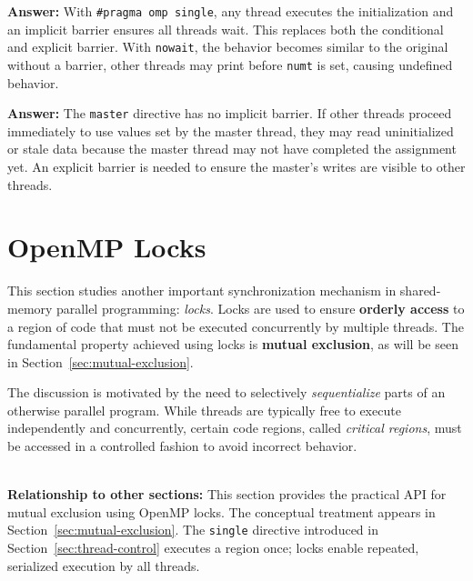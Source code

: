 \begin{ppexercises}
  
  \textbf{Answer:} With \texttt{\#pragma omp single}, any thread executes the initialization and an implicit barrier ensures all threads wait. This replaces both the conditional and explicit barrier. With \texttt{nowait}, the behavior becomes similar to the original without a barrier, other threads may print before \texttt{numt} is set, causing undefined behavior.
  
  
  \textbf{Answer:} The \texttt{master} directive has no implicit barrier. If other threads proceed immediately to use values set by the master thread, they may read uninitialized or stale data because the master thread may not have completed the assignment yet. An explicit barrier is needed to ensure the master's writes are visible to other threads.
  
\end{ppexercises}

\section{OpenMP Locks}
\label{sec:locks}

This section studies another important synchronization mechanism in shared-memory parallel programming: \emph{locks}. Locks are used to ensure \textbf{orderly access} to a region of code that must not be executed concurrently by multiple threads. The fundamental property achieved using locks is \textbf{mutual exclusion}, as will be seen in Section~\ref{sec:mutual-exclusion}.

The discussion is motivated by the need to selectively \emph{sequentialize} parts of an otherwise parallel program. While threads are typically free to execute independently and concurrently, certain code regions, called \emph{critical regions}, must be accessed in a controlled fashion to avoid incorrect behavior.

\begin{ppnote}
\textbf{\\ Relationship to other sections:} This section provides the practical API for mutual exclusion using OpenMP locks. The conceptual treatment appears in Section~\ref{sec:mutual-exclusion}. The \texttt{single} directive introduced in Section~\ref{sec:thread-control} executes a region once; locks enable repeated, serialized execution by all threads.
\end{ppnote}

